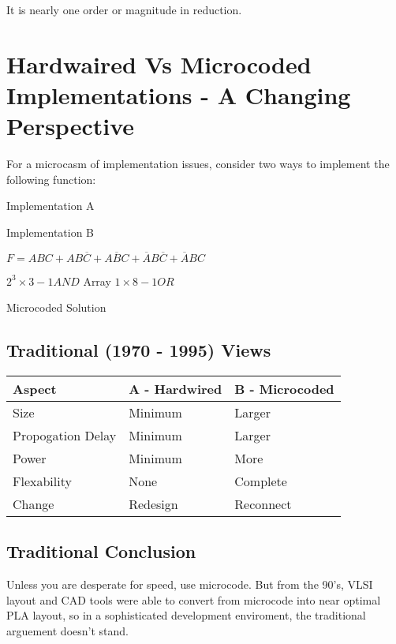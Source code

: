 \documentclass[a4paper,12pt]{article}
\begin{document}
It is nearly one order or magnitude in reduction.

\section*{Hardwaired Vs Microcoded Implementations - A Changing
Perspective}

For a microcasm of implementation issues, consider two ways to implement
the following function:

\begin{table}[hbtp]


\end{table}


\begin{table}[hbtp]


\caption{Implementation A}

\end{table}

\begin{table}[hbtp]


\caption{Implementation B}

\end{table}

$F = ABC + AB\overline{C} + A\overline{B}C + \overline{A}B\overline{C} +
\overline{A}BC$

$2^{3} \times 3 - 1 AND$ Array $1 \times 8 - 1 OR$


\begin{table}[hbtp]


\caption{Microcoded Solution}

\end{table}

\subsection*{Traditional (1970 - 1995) Views}

\begin{tabular}{|l|l|l|}
\hline
Aspect					&	A - Hardwired	&	B - Microcoded		\\
\hline
Size						&	Minimum			&	Larger				\\
\hline
Propogation Delay		&	Minimum			&	Larger				\\
\hline
Power						&	Minimum			&	More					\\
\hline
Flexability				&	None				&	Complete				\\
\hline
Change					&	Redesign			&	Reconnect			\\
\hline
\end{tabular}

\subsection*{Traditional Conclusion}

Unless you are desperate for speed, use microcode.
But from the 90's, VLSI layout and CAD tools were able to convert from
microcode into near optimal PLA layout, so in a sophisticated development
enviroment, the traditional arguement doesn't stand.
\end{document}
